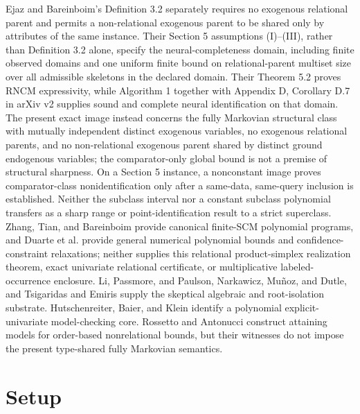 \documentclass{article}
\begin{document}
Ejaz and Bareinboim's Definition 3.2 separately requires no exogenous relational parent and permits a non-relational exogenous parent to be shared only by attributes of the same instance. Their Section 5 assumptions (I)--(III), rather than Definition 3.2 alone, specify the neural-completeness domain, including finite observed domains and one uniform finite bound on relational-parent multiset size over all admissible skeletons in the declared domain. Their Theorem 5.2 proves RNCM expressivity, while Algorithm 1 together with Appendix D, Corollary D.7 in arXiv v2 supplies sound and complete neural identification on that domain. The present exact image instead concerns the fully Markovian structural class with mutually independent distinct exogenous variables, no exogenous relational parents, and no non-relational exogenous parent shared by distinct ground endogenous variables; the comparator-only global bound is not a premise of structural sharpness. On a Section 5 instance, a nonconstant image proves comparator-class nonidentification only after a same-data, same-query inclusion is established. Neither the subclass interval nor a constant subclass polynomial transfers as a sharp range or point-identification result to a strict superclass. Zhang, Tian, and Bareinboim provide canonical finite-SCM polynomial programs, and Duarte et al. provide general numerical polynomial bounds and confidence-constraint relaxations; neither supplies this relational product-simplex realization theorem, exact univariate relational certificate, or multiplicative labeled-occurrence enclosure. Li, Passmore, and Paulson, Narkawicz, Mu\~noz, and Dutle, and Tsigaridas and Emiris supply the skeptical algebraic and root-isolation substrate. Hutschenreiter, Baier, and Klein identify a polynomial explicit-univariate model-checking core. Rossetto and Antonucci construct attaining models for order-based nonrelational bounds, but their witnesses do not impose the present type-shared fully Markovian semantics.

\section{Setup}
\end{document}
